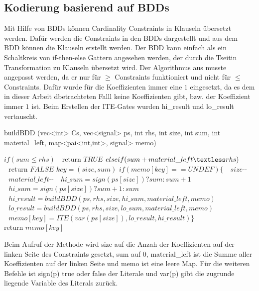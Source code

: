 \documentclass[a4,abstract=on]{scrartcl}
\begin{document}
	\subsection{Kodierung basierend auf BDDs}
Mit Hilfe von BDDs können Cardinality Constraints in Klauseln übersetzt werden. Dafür werden die Constraints in den BDDs dargestellt und aus dem BDD können die Klauseln erstellt werden. Der BDD kann einfach als ein Schaltkreis von if-then-else Gattern angesehen werden, der durch die Tseitin Transformation zu Klauseln übersetzt wird. Der Algorithmus aus \cite[][Seite 11]{niklasse} musste angepasst werden, da er nur für $\geq$ Constraints funktioniert und nicht für $\leq$ Constraints. Dafür wurde für die Koeffizienten  immer eine $1$ eingesetzt, da es dem in dieser Arbeit dbetrachteten Falll keine Koeffizienten gibt, bzw. der Koeffizient immer $1$ ist. Beim Erstellen der ITE-Gates wurden hi\_result und lo\_result vertauscht.\\

\begin{algorithm}
\caption{buildBDD (vec<int> Cs, vec<signal> ps, int rhs, int size, int sum, int material\_left, map<pai<int,int>, signal> memo)}
\label{alg:buildBDD}
\begin{algorithmic}

\State $\text{}if (sum \leq rhs)$
\State $\text{~~return } TRUE$
\State $\text{}else if (sum + material\_left \textless rhs)$
\State $\text{~~return } FALSE$
\State $\text{} key = (size, sum)$
\State $\text{}if (memo[key] == UNDEF) \{$
\State $\text{~~} size\text{-{}-}$
\State $\text{~~} material\_left \text{-{}-}$
\State $\text{~~} hi\_sum = sign(ps[size]) ? sum : sum + 1$
\State $\text{~~} hi\_sum = sign(ps[size]) ? sum + 1 : sum$
\State $\text{~~} hi\_result = buildBDD(ps , rhs, size, hi\_sum, material\_left, memo)$
\State $\text{~~} lo\_result = buildBDD(ps , rhs, size, lo\_sum, material\_left, memo)$
\State $\text{~~} memo[key] = ITE(var(ps[size]), lo\_result, hi\_result)\}$
\State $\text{return }memo[key]$
\end{algorithmic}
\end{algorithm}

Beim Aufruf der Methode wird size auf die Anzah der Koeffizienten auf der linken Seite des Constraints gesetzt, sum auf $0$, material\_left ist die Summe aller Koeffizienten auf der linken Seite und memo ist eine leere Map. Für die weiteren Befehle ist sign(p) true oder false der Literale und var(p) gibt die zugrunde liegende Variable des Literals zurück.\\
\end{document}
